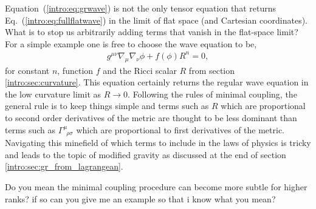Equation~(\ref{intro:eq:grwave}) is not the only tensor equation that returns Eq.~(\ref{intro:eq:fullflatwave}) in the limit of flat space (and Cartesian coordinates). What is to stop us arbitrarily adding terms that vanish in the flat-space limit? For a simple example one is free to choose the wave equation to be,
\begin{align}
g^{\mu\nu}\nabla_\mu\nabla_\nu \phi + f(\phi) R^n = 0, \label{intro:eq:modified_wave}
\end{align}
for constant $n$, function $f$ and the Ricci scalar $R$ from section \ref{intro:sec:curvature}. This equation certainly returns the regular wave equation in the low curvature limit as $R\rightarrow 0$. Following the rules of minimal coupling, the general rule is to keep things simple and terms such as $R$ which are proportional to second order derivatives of the metric are thought to be less dominant than terms such as $\Gamma^\mu_{\,\,\,\rho\sigma}$ which are proportional to first derivatives of the metric. Navigating this minefield of which terms to include in the laws of physics is tricky and leads to the topic of modified gravity as discussed at the end of section \ref{intro:sec:gr_from_lagrangean}. 

\color{choral} Do you mean the minimal coupling procedure can become more subtle for higher ranks? if so can you give me an example so that i know what you mean?\color{black}







